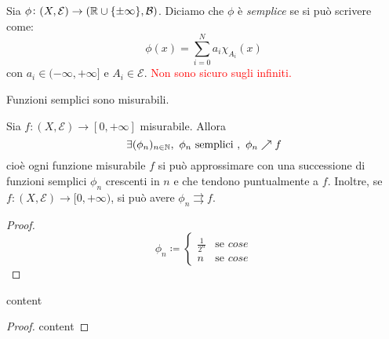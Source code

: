 \begin{definition}
	Sia $ \phi\colon (X,\mathcal{E}) \to (\mathbb{R} \cup \{\pm\infty\}, \mathcal{B}) $. Diciamo che $ \phi $ è \emph{semplice} se si può scrivere come:
	\[ \phi(x) = \sum_{i=0}^N a_i \chi_{A_i}(x) \]
	con $ a_i \in (-\infty, +\infty] $ e $ A_i \in \mathcal{E} $. \textcolor{red}{Non sono sicuro sugli infiniti.}
\end{definition}
\begin{oss}
	Funzioni semplici sono misurabili.
\end{oss}
\begin{proposition}
	Sia $ f\colon (X,\mathcal{E}) \to [0, +\infty] $ misurabile. Allora
	\[ \exists (\phi_n)_{n\in\mathbb{N}},\ \phi_n \text{ semplici },\ \phi_n \nearrow f \]
	cioè ogni funzione misurabile $ f $ si può approssimare con una successione di funzioni semplici $ \phi_n $ crescenti in $ n $ e che tendono puntualmente a $ f $.
	Inoltre, se $ f\colon (X,\mathcal{E}) \to [0,+\infty) $, si può avere $ \phi_n \rightrightarrows f $.
\end{proposition}
\begin{proof}
	\[ \phi_n \coloneqq 
		\begin{cases}
			\frac{1}{2^n} & \text{se } cose \\
			n             & \text{se } cose
		\end{cases}	
	 \]
\end{proof}
\begin{proposition}
	content
\end{proposition}
\begin{proof}
	content
\end{proof}

